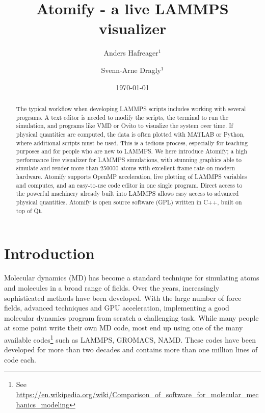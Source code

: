 \documentclass[aps,pre,twocolumn,letterpaper,floatfix]{revtex4}
\begin{document}
\title{Atomify - a live LAMMPS visualizer}
\author{Anders Hafreager$^1$}
\author{Svenn-Arne Dragly$^{1}$}
\date{\today} 

\begin{abstract} 
The typical workflow when developing LAMMPS scripts includes working with several programs. A text editor is needed to modify the scripts, the terminal to run the simulation, and programs like VMD or Ovito to visualize the system over time. If physical quantities are computed, the data is often plotted with MATLAB or Python, where additional scripts must be used. This is a tedious process, especially for teaching purposes and for people who are new to LAMMPS. 
We here introduce Atomify; a high performance live visualizer for LAMMPS simulations, with stunning graphics able to simulate and render more than 250000 atoms with excellent frame rate on modern hardware. Atomify supports OpenMP acceleration, live plotting of LAMMPS variables and computes, and an easy-to-use code editor in one single program. Direct access to the powerful machinery already built into LAMMPS allows easy access to advanced physical quantities. Atomify is open source software (GPL) written in C++, built on top of Qt. 
\end{abstract} 
 
\maketitle
 
\section{Introduction}
Molecular dynamics (MD) has become a standard technique for simulating atoms and molecules in a broad range of fields. Over the years, increasingly sophisticated methods have been developed. With the large number of force fields, advanced techniques and GPU acceleration, implementing a good molecular dynamics program from scratch a challenging task. While many people at some point write their own MD code, most end up using one of the many available codes\footnote{See \url{https://en.wikipedia.org/wiki/Comparison_of_software_for_molecular_mechanics_modeling}} such as LAMMPS\cite{Plimpton1995Fast}, GROMACS\cite{Pronk2013}, NAMD\cite{Phillips2005Scalable}. These codes have been developed for more than two decades and contains more than one million lines of code each. 
\end{document}
